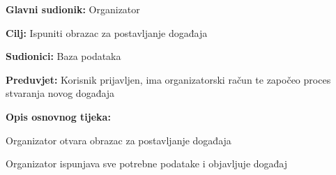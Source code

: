 					\noindent {}
\begin{packed_item}
	\item \textbf{Glavni sudionik:} Organizator
	\item  \textbf{Cilj:} Ispuniti obrazac za postavljanje događaja
	\item  \textbf{Sudionici:} Baza podataka
	\item  \textbf{Preduvjet:} Korisnik prijavljen, ima organizatorski račun te započeo proces stvaranja novog događaja
	\item  \textbf{Opis osnovnog tijeka:}
	
	\item[] \begin{packed_enum}
		
		\item Organizator otvara obrazac za postavljanje događaja
		\item Organizator ispunjava sve potrebne podatake i objavljuje događaj
	\end{packed_enum}

\end{packed_item}


